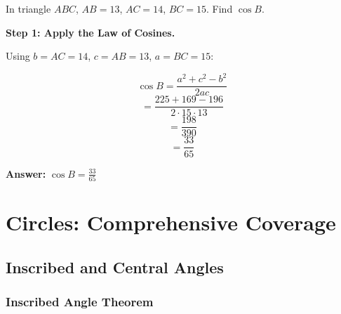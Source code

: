 ﻿\documentclass[12pt]{extarticle}
\begin{document}
In triangle $ABC$, $AB = 13$, $AC = 14$, $BC = 15$. Find $\cos B$.

\begin{solutionbox}
\textbf{Step 1: Apply the Law of Cosines.}

Using $b = AC = 14$, $c = AB = 13$, $a = BC = 15$:

\[\cos B = \frac{a^2 + c^2 - b^2}{2ac}\]
\[= \frac{225 + 169 - 196}{2 \cdot 15 \cdot 13}\]
\[= \frac{198}{390}\]
\[= \frac{33}{65}\]

\textbf{Answer:} $\boxed{\cos B = \frac{33}{65}}$
\end{solutionbox}

\section{Circles: Comprehensive Coverage}

\subsection{Inscribed and Central Angles}

\subsubsection{Inscribed Angle Theorem}
\end{document}
